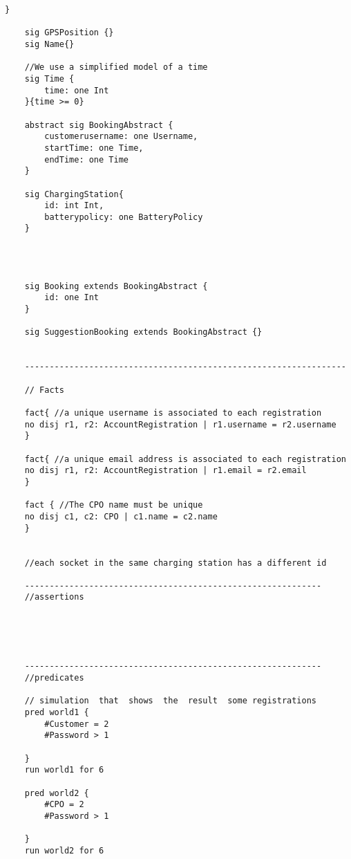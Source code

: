 \begin{lstlisting}[language=alloy]
    }

    sig GPSPosition {}
    sig Name{}

    //We use a simplified model of a time
    sig Time {
	    time: one Int
    }{time >= 0}

    abstract sig BookingAbstract {
        customerusername: one Username,
	    startTime: one Time,
	    endTime: one Time
    }

    sig ChargingStation{
        id: int Int,
        batterypolicy: one BatteryPolicy
    }


    
    
    sig Booking extends BookingAbstract {
	    id: one Int
    }
    
    sig SuggestionBooking extends BookingAbstract {}
   
    
    -----------------------------------------------------------------
    
    // Facts
    
    fact{ //a unique username is associated to each registration
	no disj r1, r2: AccountRegistration | r1.username = r2.username
    }

    fact{ //a unique email address is associated to each registration
	no disj r1, r2: AccountRegistration | r1.email = r2.email
    }

    fact { //The CPO name must be unique
	no disj c1, c2: CPO | c1.name = c2.name
    }
    

    //each socket in the same charging station has a different id
    
    ------------------------------------------------------------
    //assertions
    
    
    
    
    
    ------------------------------------------------------------
    //predicates
    
    // simulation  that  shows  the  result  some registrations
    pred world1 {
	    #Customer = 2
	    #Password > 1
	
    }
    run world1 for 6

    pred world2 {
	    #CPO = 2
	    #Password > 1
	
    }
    run world2 for 6
    
   
    
    \end{lstlisting}
